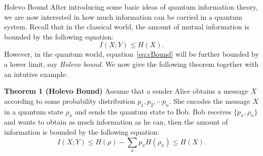 \begin{subsection}{Holevo Bound}
After introducing some basic ideas of quantum information theory, we are now interested in how much information can be carried in a quantum system.
Recall that in the classical world, the amount of mutual information is bounded by the following equation:
\begin{equation}\label{eq:cBound}
I(X;Y) \leq H(X).
\end{equation}
However, in the quantum world, equation~\eqref{eq:cBound} will be further bounded by a lower limit, say {\it{Holevo bound}}.
We now give the following theorem together with an intutive example:

\textbf{Theorem 1 (Holevo Bound)}
Assume that a sender Alice obtains a message $X$ according to some probability distribution $p_1,p_2,\cdots p_n$. She encodes the message $X$ in a quantum state $\rho_x$ and sends the quantum state to Bob. Bob receives $\{p_x,\rho_x\}$ and wants to obtain as much information as he can, then the amount of information is bounded by the following equation:
\begin{equation}\label{eq:HolevoBound}
I(X;Y) \leq H(\rho) - \underset{x}{\sum} p_xH(\rho_x) \leq H(X).
\end{equation}


\end{subsection}
